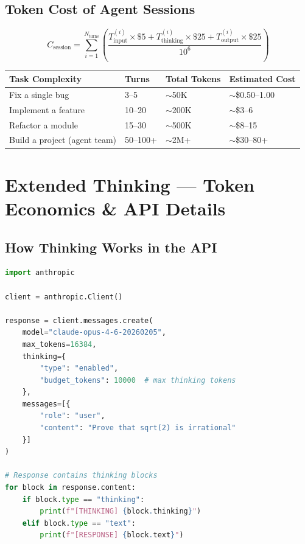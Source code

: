 \documentclass[11pt,a4paper]{article}
\begin{document}
\subsection{Token Cost of Agent Sessions}

$$C_{\text{session}} = \sum_{i=1}^{N_{\text{turns}}} \left(\frac{T_{\text{input}}^{(i)} \times \$5 + T_{\text{thinking}}^{(i)} \times \$25 + T_{\text{output}}^{(i)} \times \$25}{10^6}\right)$$

\begin{center}
\begin{tabular}{llll}
\toprule
\textbf{Task Complexity} & \textbf{Turns} & \textbf{Total Tokens} & \textbf{Estimated Cost} \\
\midrule
Fix a single bug & 3--5 & $\sim$50K & $\sim$\$0.50--1.00 \\
Implement a feature & 10--20 & $\sim$200K & $\sim$\$3--6 \\
Refactor a module & 15--30 & $\sim$500K & $\sim$\$8--15 \\
Build a project (agent team) & 50--100+ & $\sim$2M+ & $\sim$\$30--80+ \\
\bottomrule
\end{tabular}
\end{center}

\section{Extended Thinking --- Token Economics \& API Details}

\subsection{How Thinking Works in the API}

\begin{lstlisting}[language=Python, caption={Extended Thinking API Call}]
import anthropic

client = anthropic.Client()

response = client.messages.create(
    model="claude-opus-4-6-20260205",
    max_tokens=16384,
    thinking={
        "type": "enabled",
        "budget_tokens": 10000  # max thinking tokens
    },
    messages=[{
        "role": "user",
        "content": "Prove that sqrt(2) is irrational"
    }]
)

# Response contains thinking blocks
for block in response.content:
    if block.type == "thinking":
        print(f"[THINKING] {block.thinking}")
    elif block.type == "text":
        print(f"[RESPONSE] {block.text}")
\end{lstlisting}
\end{document}

